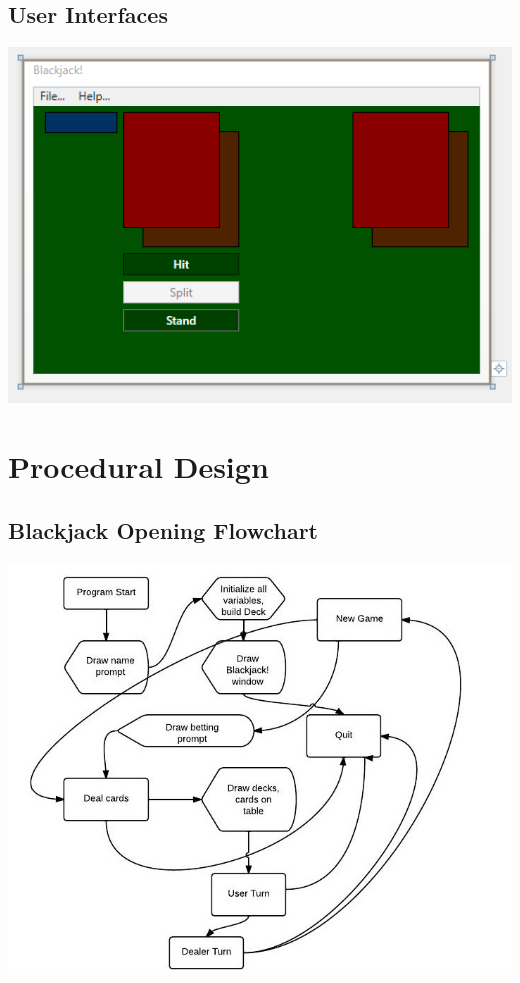 \documentclass{article}
\begin{document}
 
\subsection{User Interfaces}

\includegraphics[width=\textwidth]{interface}

 

\section{Procedural Design}



\subsection{Blackjack Opening Flowchart}
\includegraphics[width=\textwidth]{BlackjackOpeningFlowchart}
\end{document}
